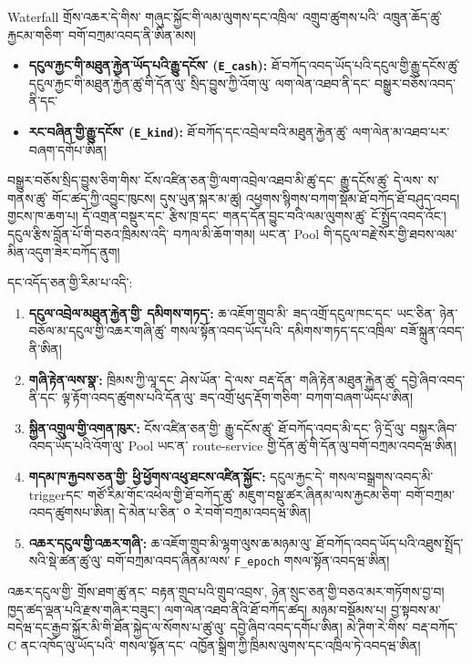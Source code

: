 \documentclass[11pt]{article}
\begin{document}
Waterfall གྲོས་འཆར་དེ་གིས་ གཞུང་སྐྱོང་གི་ལམ་ལུགས་དང་འཁྲིལ་ འགྲུབ་ཚུགས་པའི་ འཁྲུན་ཆོད་ཚུ་རྐྱངམ་གཅིག་ བགོ་བཀྲམ་འབད་ནི་ཨིན་མས།

\begin{itemize}[leftmargin=*]
\item \textbf{དངུལ་རྐྱང་གི་མཐུན་རྐྱེན་ཡོད་པའི་རྒྱུ་དངོས་ (\texttt{E\_cash}):} ཐོ་བཀོད་འབད་ཡོད་པའི་དངུལ་གྱི་རྒྱུ་དངོས་ཚུ་ དངུལ་རྐྱང་གི་མཐུན་རྐྱེན་ཚུ་གི་དོན་ལུ་ སྲིད་བྱུས་ཀྱི་འོག་ལུ་ ལག་ལེན་འཐབ་ནི་དང་ བསྒྱུར་བཅོས་འབད་ནི་དང་
\item \textbf{རང་བཞིན་གྱི་རྒྱུ་དངོས་ (\texttt{E\_kind}):} ཐོ་བཀོད་དང་འབྲེལ་བའི་མཐུན་རྐྱེན་ཚུ་ ལག་ལེན་མ་འཐབ་པར་ བཞག་དགོཔ་ཨིན།
\end{itemize}
བསྒྱུར་བཅོས་སྲིད་བྱུས་ཅིག་གིས་ ངོས་འཛིན་ཅན་གྱི་ལག་འབྲེལ་འཐབ་མི་ཚུ་དང་ རྒྱུ་དངོས་ཚུ་ དེ་ལས་ ས་གནས་ཚུ་ གོང་ཚད་ཀྱི་འབྱུང་ཁུངས། དུས་ཡུན་སྐར་མ་ཚུ། འཕྱགས་སྙིགས་བཀག་སྡོམ་ཐོ་བཀོད་ཐོ་བཤུད་འབད། གྱངས་ཁ་ཆག་པ། དོ་འགྲན་བསྡུར་དང་ རྩིས་ཁྲ་དང་ གནད་དོན་བྱུང་བའི་ལམ་ལུགས་ཚུ་ ངོ་སྤྲོད་འབད་འོང་། དངུལ་རྩིས་བློན་པོ་གི་བཅའ་ཁྲིམས་འདི་ བཀལ་མི་ཆོག་གམ། ཡང་ན་ Pool གི་དངུལ་བརྗེ་སོར་གྱི་ཐབས་ལམ་མིན་འདུག་ཟེར་བཀོད་ནུག།

དང་འདོད་ཅན་གྱི་རིམ་པ་འདི་:

\begin{enumerate}[leftmargin=*]
\item \textbf{དངུལ་འབྲེལ་མཐུན་རྐྱེན་གྱི་ དམིགས་གཏད་:} ཆ་འཇོག་གྲུབ་མི་ ཟད་འགྲོ་དངུལ་ཁང་དང་ ཡང་ཅིན་ ཉེན་བཅོལ་མ་དངུལ་གྱི་འཆར་གཞི་ཚུ་ གསལ་སྟོན་འབད་ཡོད་པའི་ དམིགས་གཏད་དང་འཁྲིལ་ བཟོ་སྐྲུན་འབད་ནི་ཨིན།
\item \textbf{གཞི་རྟེན་ལས་སྣ་:} ཁྲིམས་ཀྱི་ལཱ་དང་ ཤེས་ཡོན་ དེ་ལས་ བརྡ་དོན་ གཞི་རྟེན་མཐུན་རྐྱེན་ཚུ་ དབྱེ་ཞིབ་འབད་ནི་དང་ ལྟ་རྟོག་འབད་ཚུགས་པའི་དོན་ལུ་ ཟད་འགྲོ་ཕུད་རྡོག་གཅིག་ བཀག་བཞག་ཡོདཔ་ཨིན།
\item \textbf{སྐྱིན་འགྲུལ་གྱི་འགན་ཁུར་:} ངོས་འཛིན་ཅན་གྱི་ རྒྱུ་དངོས་ཚུ་ ཐོ་བཀོད་འབད་མི་དང་ ཉི་དྲོ་ལུ་ བསྐྱར་ཞིབ་འབད་ཡོད་པའི་འོག་ལུ་ Pool ཡང་ན་ route-service གྱི་དོན་ཚུ་གི་དོན་ལུ་བགོ་བཀྲམ་འབདཝ་ཨིན།
\item \textbf{གདམ་ཁ་རྐྱབས་ཅན་གྱི་ ཕྱི་ཕྱོགས་འཕུ་ཐངས་འཛིན་སྐྱོང་:} དངུལ་རྐྱང་དེ་ གསལ་བསྒྲགས་འབད་མི་ triggerདང་ གཙོ་རིམ་གོང་འཕེལ་གྱི་ཐོ་བཀོད་ཚུ་ མཇུག་བསྡུ་ཚར་ཞིནམ་ལས་རྐྱངམ་ཅིག་ བགོ་བཀྲམ་འབད་ཚུགསཔ་ཨིན། དེ་མེན་པ་ཅིན་ ༠ རེ་བགོ་བཀྲམ་འབདཝ་ཨིན།
\item \textbf{འཆར་དངུལ་གྱི་འཆར་གཞི་:} ཆ་འཇོག་གྲུབ་མི་ལྷག་ལུས་ཆ་མཉམ་ལུ་ ཐོ་བཀོད་འབད་ཡོད་པའི་འཐུས་སྤྲོད་སའི་སྡེ་ཚན་ཚུ་ལུ་ བགོ་བཀྲམ་འབད་ཞིནམ་ལས་ \texttt{F\_epoch} གསལ་སྟོན་འབདཝ་ཨིན།
\end{enumerate}
འཆར་དངུལ་གྱི་ གྲོས་ཐག་ཚུ་ནང་ བརྟན་གྲུབ་པའི་གྲུབ་འབྲས་, ཉེན་སྲུང་ཅན་གྱི་བཅའ་མར་གཏོགས་བྱ་བ། ཁྱད་ཚད་ལྡན་པའི་རྫས་གཞིར་བཟུང་། ལག་ལེན་འཐབ་ནིའི་ཐོ་བཀོད་ཚད། མཉམ་བསྡོམས་པ། བྱ་སྟབས་མ་བདེཝ་དང་རྒྱབ་སྐྱོར་མི་གི་ཐོན་སྐྱེད་ལ་སོགས་པ་ཚུ་ལུ་ དབྱེ་ཞིབ་འབད་དགོཔ་ཨིན། མེ་ཊིག་རེ་གིས་ བརྡ་བཀོད་ C ནང་འཁོད་ལུ་ཡོད་པའི་ གསལ་སྟོན་དང་ འཁྱོན་སྒྲིག་ཀྱི་ཁྲིམས་ལུགས་དང་འཁྲིལ་ཏེ་འབདཝ་ཨིན།
\end{document}

